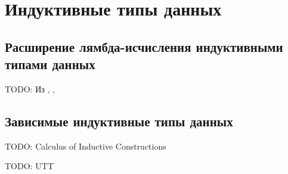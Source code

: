 \section{Индуктивные типы данных}

\subsection{Расширение лямбда-исчисления индуктивными типами данных}

TODO: Из \cite{tapl}, \cite{proving-properties-of-programs-by-structural-induction},
\cite{transformation-system-for-developing-recursive-programs}

\subsection{Зависимые индуктивные типы данных}

TODO: Calculus of Inductive Constructions

TODO: UTT
